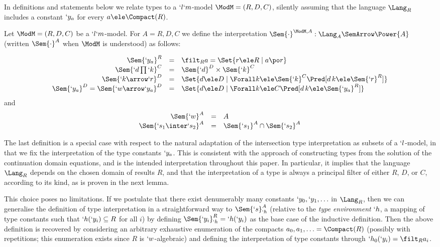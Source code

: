 \documentclass{CSML}
\begin{document}
In definitions and statements below we relate types to a $`l`m$-model ${\ModM}=(R,D,C)$, silently assuming that the language $\Lang_R$ includes a constant $`y_a$ for every $a\ele \Compact(R)$.

 \begin{defi} \label{def:typesInterpretation}
Let ${\ModM}=(R,D,C)$ be a $`l`m$-model.
For $A = R,D,C$ we define the interpretation $ \Sem{ \cdot}^{{\ModM},A} : \Lang_{A} \SemArrow \Power{A}$ (written $\Sem{ \cdot}^A$ when $\ModM$ is understood) as follows:

 \[ \begin{array}[t]{rcl}
\Sem{ `y_a}^R &=& \filt_R a = \Set{r \ele R \mid a \po r} \\ %
\Sem{ `d\prod `k }^C &=& \Sem{`d}^D \times \Sem{ `k }^C \\ %
\Sem{ `k\arrow `r}^D &=& \Set{d \ele D \mid \Forall k \ele \Sem{ `k }^C \Pred [ d \, k \ele \Sem{ `r}^R ]} \\ %
\Sem{ `y_a}^D = \Sem{ `w\arrow `y_a}^D &=& \Set{d \ele D \mid \Forall k \ele C \Pred [ d \, k \ele \Sem{ `y_a}^R ] }
 \end{array} \]
and
%
 \[ \begin{array}[t]{rcl}
\Sem{ `w}^A &=& A \\ %
\Sem{ `s_1 \inter`s_2}^A &=& \Sem{ `s_1}^A \cap \Sem{ `s_2}^A 
 \end{array} \]
 \end{defi}

 \begin{rem} \label{rem:typeconstinterp}
The last definition is a special case with respect to the natural adaptation of the intersection type interpretation as subsets of a $`l$-model, in that we fix the interpretation of the type constants $`y_a$. 
This is consistent with the approach of constructing types from the solution of the continuation domain equations, and is the intended interpretation throughout this paper. 
In particular, it implies that the language $\Lang_R$ depends on the chosen domain of results $R$, and that the interpretation of a type is always a principal filter of either $R$, $D$, or $C$, according to its kind, as is proven in the next lemma. 

This choice poses no limitations. 
If we postulate that there exist denumerably many constants $`y_0, `y_1, \ldots$ in $\Lang_R$, then we can generalise the definition of type interpretation in a straightforward way to $\Sem{`s}^A_{`h}$ (relative to the \emph{type environment} $`h$, a mapping of type constants such that $`h(`y_i) \subseteq R$ for all $i$) by defining $\Sem{ `y_i}^R_{`h} = `h(`y_i)$ as the base case of the inductive definition. 
Then the above definition is recovered by considering an arbitrary exhaustive enumeration of the compacts $a_0, a_1, \ldots = \Compact(R)$ (possibly with repetitions; this enumeration exists since $R$ is $`w$-algebraic) and defining the interpretation of type constants through $`h_0(`y_i) = \filt_R a_i$.
 \end{rem}
\end{document}
